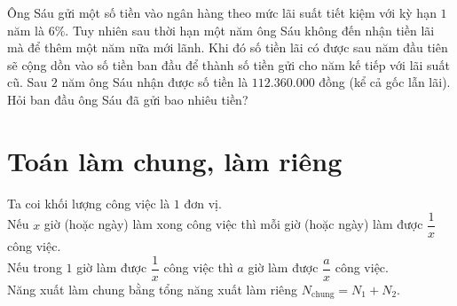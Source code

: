 \begin{bt}%
Ông Sáu gửi một số tiền vào ngân hàng theo mức lãi suất tiết kiệm với kỳ hạn $ 1 $ năm là $ 6\% $. Tuy nhiên sau thời hạn một năm ông Sáu không đến nhận tiền lãi mà để thêm một năm nữa mới lãnh. Khi đó số tiền lãi có được sau năm đầu tiên sẽ cộng dồn vào số tiền ban đầu để thành số tiền gửi cho năm kế tiếp với lãi suất cũ. Sau $ 2 $ năm ông Sáu nhận được số tiền là $ 112.360.000 $ đồng (kể cả gốc lẫn lãi). Hỏi ban đầu ông Sáu đã gửi bao nhiêu tiền?
\end{bt}



\section{Toán làm chung, làm riêng}

\begin{tcolorbox}
	Ta coi khối lượng công việc là $1$ đơn vị. \\
	Nếu $x$ giờ (hoặc ngày) làm xong công việc thì mỗi giờ (hoặc ngày) làm được $\dfrac{1}{x}$ công việc.\\
	Nếu trong $1$ giờ làm được $\dfrac{1}{x}$ công việc thì $a$ giờ làm được $\dfrac{a}{x}$ công việc.\\
	Năng xuất làm chung bằng tổng năng xuất làm riêng $N_{\text{chung}} = N_{1} + N_{2}$.
\end{tcolorbox}

